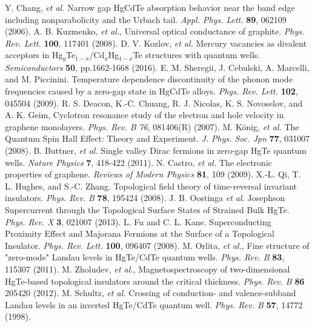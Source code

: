 \documentclass[titlepage,a4paper]{book}
\begin{document}
\begin{thebibliography}{199}
Y. Chang, \textit{et al.} Narrow gap HgCdTe absorption behavior near the band edge including nonparabolicity and the Urbach tail. \textit{Appl. Phys. Lett.} \textbf{89}, 062109 (2006).
A. B. Kuzmenko, \textit{et al.}, Universal optical conductance of graphite. \textit{Phys. Rev. Lett.} \textbf{100}, 117401 (2008).
D. V. Kozlov, \textit{et al.} Mercury vacancies as divalent acceptors in Hg$_y$Te$_{1-x}$/Cd$_x$Hg$_{1-x}$Te structures with quantum wells. \textit{Semiconductors} \textbf{50}, pp.1662-1668 (2016).
E. M. Sheregii, J. Cebulski, A. Marcelli, and M. Piccinini. Temperature dependence discontinuity of the phonon mode frequencies caused by a zero-gap state in HgCdTe alloys. \textit{Phys. Rev. Lett.} \textbf{102}, 045504 (2009). 
R. S. Deacon, K.-C. Chuang, R. J. Nicolas, K. S. Novoselov, and A. K. Geim, Cyclotron resonance study of the electron and hole velocity in graphene monolayers. \textit{Phys. Rev. B} \textit{76}, 081406(R) (2007).
M. König, \textit{et al.} The Quantum Spin Hall Effect: Theory and Experiment. \textit{J. Phys. Soc. Jpn} \textbf{77}, 031007 (2008).
B. Buttner, \textit{et al.} Single valley Dirac fermions in zero-gap HgTe quantum wells. \textit{Nature Physics} \textbf{7}, 418-422 (2011).
N. Castro, \textit{et al.} The electronic properties of graphene. \textit{Reviews of Modern Physics} \textbf{81}, 109 (2009).
X.-L. Qi, T. L. Hughes, and S.-C. Zhang. Topological field theory of time-reversal invariant insulators. \textit{Phys. Rev. B} \textbf{78}, 195424 (2008).
J. B. Oostinga \textit{et al.} Josephson Supercurrent through the Topological Surface States of Strained Bulk HgTe. \textit{Phys. Rev. X} \textbf{3}, 021007 (2013).
L. Fu and C. L. Kane. Superconducting Proximity Effect and Majorana Fermions at the Surface of a Topological Insulator. \textit{Phys. Rev. Lett.} \textbf{100}, 096407 (2008).
M. Orlita, \textit{et al.}, Fine structure of "zero-mode" Landau levels in HgTe/CdTe quantum wells. \textit{Phys. Rev. B} \textbf{83}, 115307 (2011).
M. Zholudev, \textit{et al.}, Magnetospectroscopy of two-dimensional HgTe-based topological insulators around the critical thickness. \textit{Phys. Rev. B} \textbf{86} 205420 (2012).
M. Schultz, \textit{et al.} Crossing of conduction- and valence-subband Landau levels in an inverted HgTe/CdTe quantum well. \textit{Phys. Rev. B} \textbf{57}, 14772 (1998).

\end{thebibliography}
\end{document}
